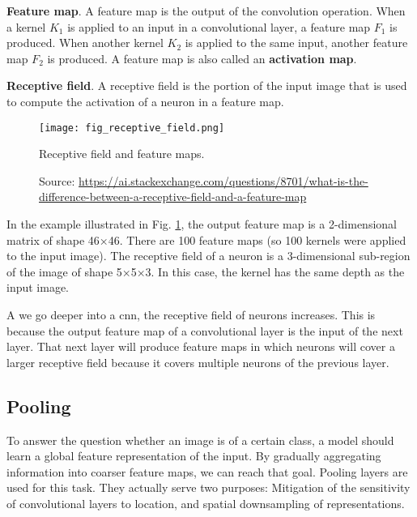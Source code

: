 \textbf{Feature map}. A feature map is the output of the convolution operation. When a kernel $K_1$ is applied to an input in a convolutional layer, a feature map $F_1$ is produced. When another kernel $K_2$ is applied to the same input, another feature map $F_2$ is produced. A feature map is also called an \textbf{activation map}.

\textbf{Receptive field}. A receptive field is the portion of the input image that is used to compute the activation of a neuron in a feature map.

\begin{figure}[ht]
    \begin{center}       
    \texttt{[image: fig\_receptive\_field.png]}
    \caption[Receptive field and feature maps]{Receptive field and feature maps.}
    \caption*{Source: \href{https://ai.stackexchange.com/questions/8701/what-is-the-difference-between-a-receptive-field-and-a-feature-map}{https://ai.stackexchange.com/questions/8701/what-is-the-difference-between-a-receptive-field-and-a-feature-map}}
    \label{fig:receptive_field}
    \end{center}
\end{figure}

In the example illustrated in Fig. \ref{fig:receptive_field}, the output feature map is a 2-dimensional matrix of shape 46×46. There are 100 feature maps (so 100 kernels were applied to the input image). The receptive field of a neuron is a 3-dimensional sub-region of the image of shape 5×5×3. In this case, the kernel has the same depth as the input image.

A we go deeper into a \acrshort{cnn}, the receptive field of neurons increases. This is because the output feature map of a convolutional layer is the input of the next layer. That next layer will produce feature maps in which neurons will cover a larger receptive field because it covers multiple neurons of the previous layer.

\subsection{Pooling}
To answer the question whether an image is of a certain class, a model should learn a global feature representation of the input. By gradually aggregating information into coarser feature maps, we can reach that goal. Pooling layers are used for this task. They actually serve two purposes: Mitigation of the sensitivity of convolutional layers to location, and spatial downsampling of representations.

